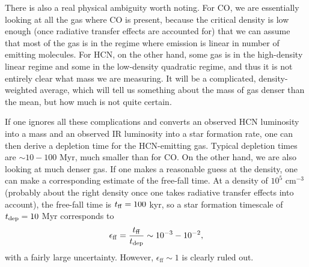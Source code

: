 There is also a real physical ambiguity worth noting. For CO, we are essentially looking at all the gas where CO is present, because the critical density is low enough (once radiative transfer effects are accounted for) that we can assume that most of the gas is in the regime where emission is linear in number of emitting molecules. For HCN, on the other hand, some gas is in the high-density linear regime and some in the low-density quadratic regime, and thus it is not entirely clear what mass we are measuring. It will be a complicated, density-weighted average, which will tell us something about the mass of gas denser than the mean, but how much is not quite certain.

If one ignores all these complications and converts an observed HCN luminosity into a mass and an observed IR luminosity into a star formation rate, one can then derive a depletion time for the HCN-emitting gas. Typical depletion times are $\sim 10-100$ Myr, much smaller than for CO. On the other hand, we are also looking at much denser gas. If one makes a reasonable guess at the density, one can make a corresponding estimate of the free-fall time. At a density of $10^5$ cm$^{-3}$ (probably about the right density once one takes radiative transfer effects into account), the free-fall time is $t_{\rm ff} = 100$ kyr, so a star formation timescale of $t_{\rm dep} = 10$ Myr corresponds to
\begin{equation}
\epsilon_{\rm ff} = \frac{t_{\rm ff}}{t_{\rm dep}} \sim 10^{-3} - 10^{-2},
\end{equation}
with a fairly large uncertainty. However, $\epsilon_{\mathrm{ff}} \sim 1$ is clearly ruled out.
